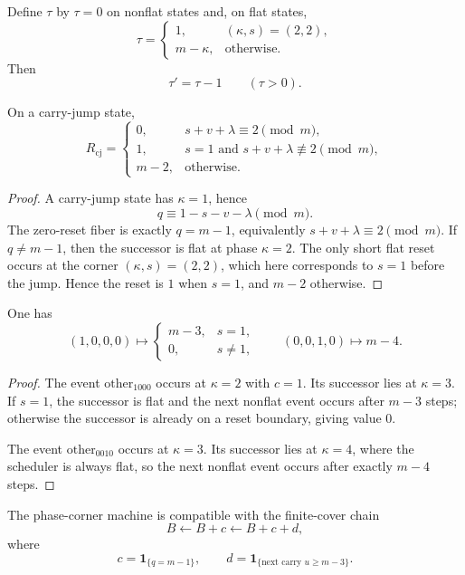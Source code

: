 \begin{corollary}
Define $\tau$ by $\tau=0$ on nonflat states and, on flat states,
\[
\tau=
\begin{cases}
1,& (\kappa,s)=(2,2),\\
m-\kappa,& \text{otherwise}.
\end{cases}
\]
Then
\[
\tau' = \tau-1 \qquad (\tau>0).
\]
\end{corollary}

\begin{corollary}
On a carry-jump state,
\[
R_{\mathrm{cj}}=
\begin{cases}
0,& s+v+\lambda\equiv 2 \pmod m,\\
1,& s=1 \text{ and } s+v+\lambda\not\equiv 2 \pmod m,\\
m-2,& \text{otherwise.}
\end{cases}
\]
\end{corollary}

\begin{proof}
A carry-jump state has $\kappa=1$, hence
\[
q\equiv 1-s-v-\lambda \pmod m.
\]
The zero-reset fiber is exactly $q=m-1$, equivalently
$s+v+\lambda\equiv 2\pmod m$. If $q\neq m-1$, then the successor is flat at
phase $\kappa=2$. The only short flat reset occurs at the corner
$(\kappa,s)=(2,2)$, which here corresponds to $s=1$ before the jump. Hence the
reset is $1$ when $s=1$, and $m-2$ otherwise.
\end{proof}

\begin{corollary}
One has
\[
(1,0,0,0)\mapsto
\begin{cases}
m-3,& s=1,\\
0,& s\neq 1,
\end{cases}
\qquad
(0,0,1,0)\mapsto m-4.
\]
\end{corollary}

\begin{proof}
The event $\mathrm{other}_{1000}$ occurs at $\kappa=2$ with $c=1$. Its
successor lies at $\kappa=3$. If $s=1$, the successor is flat and the next
nonflat event occurs after $m-3$ steps; otherwise the successor is already on a
reset boundary, giving value $0$.

The event $\mathrm{other}_{0010}$ occurs at $\kappa=3$. Its successor lies at
$\kappa=4$, where the scheduler is always flat, so the next nonflat event
occurs after exactly $m-4$ steps.
\end{proof}

\begin{corollary}
The phase-corner machine is compatible with the finite-cover chain
\[
B \leftarrow B+c \leftarrow B+c+d,
\]
where
\[
c=\mathbf 1_{\{q=m-1\}},
\qquad
d=\mathbf 1_{\{\text{next carry }u\ge m-3\}}.
\]
\end{corollary}

